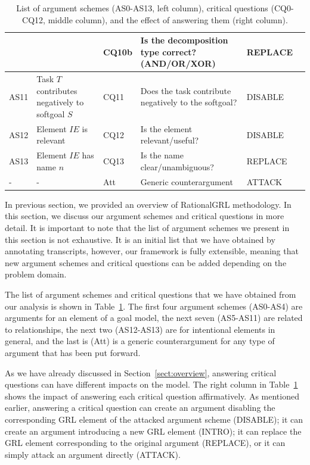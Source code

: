 \begin{table}[h]
\begin{tabularx}{\textwidth}{|l|l|l|X|l|l|}
 &  & CQ10b & Is the decomposition type correct? (AND/OR/XOR)& REPLACE\\
\hline
AS11 & Task $T$ contributes negatively to softgoal $S$& CQ11 & Does the task contribute negatively to the softgoal?& DISABLE\\
\hline
\hline
AS12 & Element $IE$ is relevant & CQ12 & Is the element relevant/useful? & DISABLE\\
\hline
AS13 & Element $IE$ has name $n$ & CQ13 & Is the name clear/unambiguous? & REPLACE\\
\hline
\hline
- & - & Att & Generic counterargument & ATTACK\\
\hline
\end{tabularx}
\caption{List of argument schemes (AS0-AS13, left column), critical questions (CQ0-CQ12, middle column), and the effect of answering them (right column).}
\label{table:argument-schemes}
\end{table}

In previous section, we provided an overview of RationalGRL methodology. In this section, we discuss our argument schemes and critical questions in more detail. It is important to note that the list of argument schemes we present in this section is not exhaustive. It is an initial list that we have obtained by annotating transcripts, however, our framework is fully extensible, meaning that new argument schemes and critical questions can be added depending on the problem domain.

The list of argument schemes and critical questions that we have obtained from our analysis is shown in Table~\ref{table:argument-schemes}. The first four argument schemes (AS0-AS4) are arguments for an element of a goal model, the next seven (AS5-AS11) are related to relationships, the next two (AS12-AS13) are for intentional elements in general, and the last is (Att) is a generic counterargument for any type of argument that has been put forward.

As we have already discussed in Section~\ref{sect:overview}, answering critical questions can have different impacts on the model. The right column in Table~\ref{table:argument-schemes} shows the impact of answering each critical question affirmatively. %
As mentioned earlier, answering a critical question can create an argument disabling the corresponding GRL element of the attacked argument scheme (\textsf{DISABLE}); it can create an argument introducing a new GRL element (\textsf{INTRO}); it can replace the GRL element corresponding to the original argument (\textsf{REPLACE}), or it can simply attack an argument directly (\textsf{ATTACK}).

